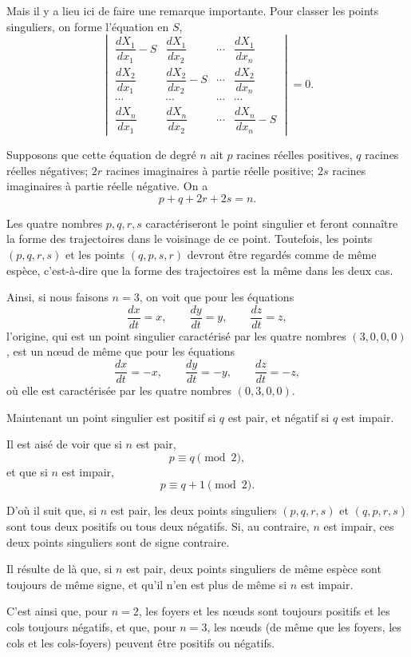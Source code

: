 \documentclass[11pt]{article}
\begin{document}
Mais il y a lieu ici de faire une remarque importante. Pour classer les points singuliers, on forme l’équation en $S$,
\[
\begin{vmatrix}
\dfrac{dX_1}{dx_1}-S & \dfrac{dX_1}{dx_2} & \cdots & \dfrac{dX_1}{dx_n}\\
\dfrac{dX_2}{dx_1} & \dfrac{dX_2}{dx_2}-S & \cdots & \dfrac{dX_2}{dx_n}\\
\cdots & \cdots & \cdots & \cdots\\
\dfrac{dX_n}{dx_1} & \dfrac{dX_n}{dx_2} & \cdots & \dfrac{dX_n}{dx_n}-S
\end{vmatrix}=0.
\]

Supposons que cette équation de degré $n$ ait $p$ racines réelles positives, $q$ racines réelles négatives; $2r$ racines imaginaires à partie réelle positive; $2s$ racines imaginaires à partie réelle négative. On a
\[
p+q+2r+2s=n.
\]

Les quatre nombres $p,q,r,s$ caractériseront le point singulier et feront connaître la forme des trajectoires dans le voisinage de ce point. Toutefois, les points $(p,q,r,s)$ et les points $(q,p,s,r)$ devront être regardés comme de même espèce, c’est-à-dire que la forme des trajectoires est la même dans les deux cas.

Ainsi, si nous faisons $n=3$, on voit que pour les équations
\[
\frac{dx}{dt}=x,
\qquad
\frac{dy}{dt}=y,
\qquad
\frac{dz}{dt}=z,
\]
l’origine, qui est un point singulier caractérisé par les quatre nombres $(3,0,0,0)$, est un nœud de même que pour les équations
\[
\frac{dx}{dt}=-x,
\qquad
\frac{dy}{dt}=-y,
\qquad
\frac{dz}{dt}=-z,
\]
où elle est caractérisée par les quatre nombres $(0,3,0,0)$.

Maintenant un point singulier est positif si $q$ est pair, et négatif si $q$ est impair.

Il est aisé de voir que si $n$ est pair,
\[
p\equiv q\pmod 2,
\]
et que si $n$ est impair,
\[
p\equiv q+1\pmod 2.
\]

D’où il suit que, si $n$ est pair, les deux points singuliers $(p,q,r,s)$ et $(q,p,r,s)$ sont tous deux positifs ou tous deux négatifs. Si, au contraire, $n$ est impair, ces deux points singuliers sont de signe contraire.

Il résulte de là que, si $n$ est pair, deux points singuliers de même espèce sont toujours de même signe, et qu’il n’en est plus de même si $n$ est impair.

C’est ainsi que, pour $n=2$, les foyers et les nœuds sont toujours positifs et les cols toujours négatifs, et que, pour $n=3$, les nœuds (de même que les foyers, les cols et les cols-foyers) peuvent être positifs ou négatifs.
\end{document}
